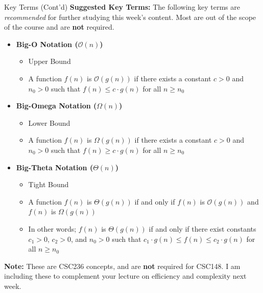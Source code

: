 \documentclass[hyperref={colorlinks,citecolor=blue,linkcolor=blue,urlcolor=blue}, aspectratio=1610]{beamer}
\begin{document}
\begin{frame}{Key Terms (Cont'd)}
    \textbf{Suggested Key Terms:} The following key terms are \textit{recommended} for further studying this week's content. Most are out of the scope of the course and are \textbf{not} required. 
    \begin{itemize} 

      \item \textbf{Big-O Notation ($\mathcal{O}(n)$)}
      \begin{itemize}
        \item Upper Bound
        \item A function $f(n)$ is $\mathcal{O}(g(n))$ if there exists a constant $c > 0$ and $n_0 > 0$ such that $f(n) \leq c \cdot g(n)$ for all $n \geq n_0$
      \end{itemize}
      \item \textbf{Big-Omega Notation ($\Omega(n)$)}
      \begin{itemize}
        \item Lower Bound
        \item A function $f(n)$ is $\Omega(g(n))$ if there exists a constant $c > 0$ and $n_0 > 0$ such that $f(n) \geq c \cdot g(n)$ for all $n \geq n_0$
      \end{itemize}
      \item \textbf{Big-Theta Notation ($\Theta(n)$)}
      \begin{itemize}
        \item Tight Bound
        \item A function $f(n)$ is $\Theta(g(n))$ if and only if $f(n)$ is $\mathcal{O}(g(n))$ and $f(n)$ is $\Omega(g(n))$
        \item In other words; $f(n)$ is $\Theta(g(n))$ if and only if there exist constants $c_1 > 0$, $c_2 > 0$, and $n_0 > 0$ such that $c_1 \cdot g(n) \leq f(n) \leq c_2 \cdot g(n)$ for all $n \geq n_0$
        
      \end{itemize}
      
    \end{itemize}
    \textbf{Note:} These are CSC236 concepts, and are \textbf{not} required for CSC148. I am including these to complement your lecture on efficiency and complexity next week.
    
  
\end{frame}
\end{document}
